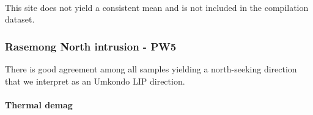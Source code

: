 \documentclass{article}
\begin{document}
    \begin{center}
    \end{center}
    { \hspace*{\fill} \\}
    
    This site does not yield a consistent mean and is not included in the
compilation dataset.

    \subsubsection{Rasemong North intrusion -
PW5}\label{rasemong-north-intrusion---pw5}

    There is good agreement among all samples yielding a north-seeking
direction that we interpret as an Umkondo LIP direction.

    \paragraph{Thermal demag}\label{thermal-demag}
\end{document}
